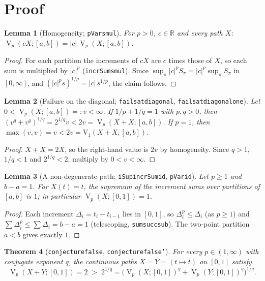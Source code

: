 \documentclass[11pt]{article}
\renewcommand{\_}{\oldus\allowbreak}
\newtheorem{theorem}{Theorem}
\newtheorem{lemma}[theorem]{Lemma}
\theoremstyle{definition}
\theoremstyle{remark}
\newcommand{\V}{\operatorname{V}_p}
\begin{document}
\section{Proof}

\begin{lemma}[Homogeneity; \texttt{pVar\_smul}]
For $p>0$, $c\in\mathbb{R}$ and every path $X$: $\V(cX;[a,b]) = |c|\,\V(X;[a,b])$.
\end{lemma}
\begin{proof}
For each partition the increments of $cX$ are $c$ times those of $X$, so each sum is multiplied
by $|c|^p$ (\texttt{incrSum\_smul}). Since $\sup_\pi |c|^p S_\pi = |c|^p\sup_\pi S_\pi$ in
$[0,\infty]$, and $(|c|^p s)^{1/p}=|c|\,s^{1/p}$, the claim follows.
\end{proof}

\begin{lemma}[Failure on the diagonal; \texttt{fails\_at\_diagonal}, \texttt{fails\_at\_diagonal\_one}]\label{lem:diag}
Let $0<\V(X;[a,b])=:v<\infty$. If $1/p+1/q=1$ with $p,q>0$, then
$(v^q+v^q)^{1/q} = 2^{1/q}v < 2v = \V(X+X;[a,b])$. If $p=1$, then $\max(v,v)=v<2v=\mathrm{V}_1(X+X;[a,b])$.
\end{lemma}
\begin{proof}
$X+X=2X$, so the right-hand value is $2v$ by homogeneity. Since $q>1$, $1/q<1$ and $2^{1/q}<2$;
multiply by $0<v<\infty$.
\end{proof}

\begin{lemma}[A non-degenerate path; \texttt{iSup\_incrSum\_id}, \texttt{pVar\_id}]
Let $p\ge1$ and $b-a=1$. For $X(t)=t$, the supremum of the increment sums over partitions of
$[a,b]$ is $1$; in particular $\V(X;[0,1])=1$.
\end{lemma}
\begin{proof}
Each increment $\Delta_i=t_i-t_{i-1}$ lies in $[0,1]$, so $\Delta_i^p\le\Delta_i$ (as $p\ge1$) and
$\sum\Delta_i^p\le\sum\Delta_i=b-a=1$ (telescoping, \texttt{sum\_succ\_sub}). The two-point
partition $a<b$ gives exactly $1$.
\end{proof}

\begin{theorem}[\texttt{conjecture\_00000004007\_false}, \texttt{conjecture\_00000004007\_false'}]
For every $p\in(1,\infty)$ with conjugate exponent $q$, the continuous paths $X=Y=(t\mapsto t)$ on
$[0,1]$ satisfy
\[
  \V(X+Y;[0,1]) = 2 \;>\; 2^{1/q} = \bigl(\V(X;[0,1])^q+\V(Y;[0,1])^q\bigr)^{1/q}.
\]
\end{theorem}
\end{document}

